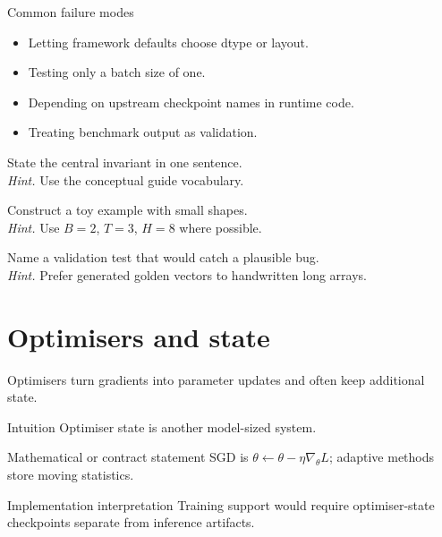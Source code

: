 \begin{warningbox}{Common failure modes}
\begin{itemize}
\item Letting framework defaults choose dtype or layout.
\item Testing only a batch size of one.
\item Depending on upstream checkpoint names in runtime code.
\item Treating benchmark output as validation.
\end{itemize}
\end{warningbox}

\begin{chapterexercises}
\item State the central invariant in one sentence.\\
\textit{Hint.} Use the conceptual guide vocabulary.
\item Construct a toy example with small shapes.\\
\textit{Hint.} Use $B=2$, $T=3$, $H=8$ where possible.
\item Name a validation test that would catch a plausible bug.\\
\textit{Hint.} Prefer generated golden vectors to handwritten long arrays.
\end{chapterexercises}

\chapter{Optimisers and state}
\label{ch:optimisers}
Optimisers turn gradients into parameter updates and often keep additional state.



\begin{intuitionbox}{Intuition}
Optimiser state is another model-sized system.
\end{intuitionbox}

\begin{definitionbox}{Mathematical or contract statement}
SGD is \(\theta\leftarrow\theta-\eta\nabla_\theta L\); adaptive methods store moving statistics.
\end{definitionbox}

\begin{implementationbox}{Implementation interpretation}
Training support would require optimiser-state checkpoints separate from inference artifacts.
\end{implementationbox}


